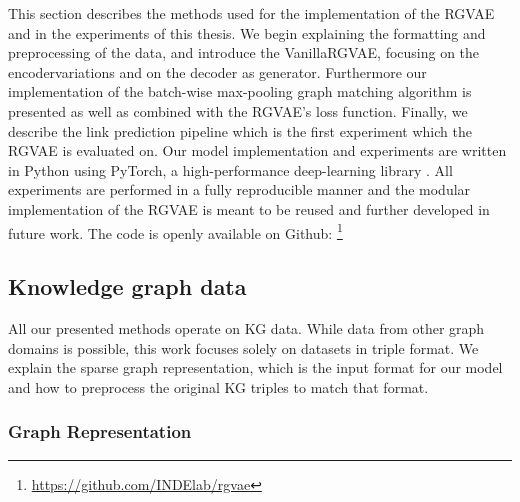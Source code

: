 This section describes the methods used for the implementation of the RGVAE and in the experiments of this thesis. We begin explaining the formatting and preprocessing of the data, and introduce the VanillaRGVAE, focusing on the encodervariations and on the decoder as generator. Furthermore our implementation of the batch-wise max-pooling graph matching algorithm is presented as well as combined with the RGVAE's loss function. Finally, we describe the link prediction pipeline which is the first experiment which the RGVAE is evaluated on. Our model implementation and experiments are written in Python using PyTorch, a high-performance deep-learning library \cite{paszke_pytorch_2019}. All experiments are performed in a fully reproducible manner and the modular implementation of the RGVAE is meant to be reused and further developed in future work. The code is openly available on Github: \footnote{\url{https://github.com/INDElab/rgvae}}

\subsection{Knowledge graph data}
All our presented methods operate on KG data. While data from other graph domains is possible, this work focuses solely on datasets in triple format. We explain the sparse graph representation, which is the input format for our model and how to preprocess the original KG triples to match that format.

\subsubsection{Graph Representation}


